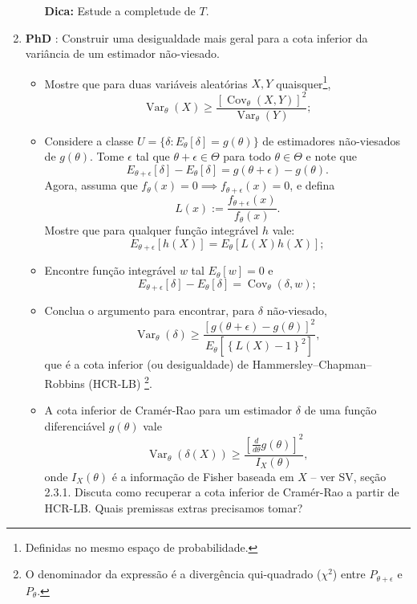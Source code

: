 \documentclass[a4paper,10pt, notitlepage]{report}
\newcommand{\vr}{\operatorname{Var}} %
\begin{document}
\begin{enumerate}
\begin{enumerate}
    \textbf{Dica:} Estude a completude de $T$.
\end{enumerate}
    \item \textbf{PhD }: Construir uma desigualdade mais geral para a cota inferior da variância de um estimador não-viesado.
    \begin{itemize}
        \item Mostre que para duas variáveis aleatórias $X, Y$ quaisquer\footnote{Definidas no mesmo espaço de probabilidade.},
        $$ \vr_\theta(X) \geq \frac{[\operatorname{Cov}_\theta(X, Y)]^2}{\vr_\theta(Y)}; $$
        \item Considere a classe $U = \{ \delta : E_\theta[\delta] = g(\theta) \}$ de estimadores não-viesados de $g(\theta)$.
        Tome $\epsilon$ tal que $\theta + \epsilon \in \Theta$ para todo $\theta \in \Theta$ e note que 
        $$E_{\theta + \epsilon}[\delta] - E_\theta[\delta] = g(\theta + \epsilon) - g(\theta).$$
        Agora, assuma que $f_{\theta}(x) = 0 \implies f_{\theta + \epsilon}(x) = 0$, e defina
        $$ L(x) := \frac{ f_{\theta + \epsilon}(x)}{ f_{\theta}(x)}.$$
        Mostre que para qualquer função integrável $h$ vale:
        $$E_{\theta + \epsilon}[h(X)] = E_{\theta}[L(X)h(X)];$$
        \item Encontre função integrável $w$ tal $E_\theta[w] = 0$ e 
        $$E_{\theta + \epsilon}[\delta] - E_\theta[\delta] = \operatorname{Cov}_\theta(\delta, w);$$
        \item Conclua o argumento para encontrar, para $\delta$ não-viesado,
        \begin{equation}
            \label{eq:HCR}
            \vr_\theta(\delta) \geq \frac{[g(\theta + \epsilon) - g(\theta)]^2}{E_\theta\left[\left\{L(X) - 1\right\}^2\right]},
        \end{equation}
        que é a cota inferior (ou desigualdade) de Hammersley–Chapman–Robbins (HCR-LB) \footnote{O denominador da expressão é a divergência qui-quadrado ($\chi^2$) entre $P_{\theta+\epsilon}$ e $P_\theta$.}.
        \item A cota inferior de Cramér-Rao para um estimador $\delta$ de uma função diferenciável $g(\theta)$ vale
        \begin{equation*}
            \vr_\theta(\delta(X)) \geq \frac{\left[\frac{d}{d\theta}g(\theta)\right]^2}{I_X(\theta)},
        \end{equation*}
        onde $I_X(\theta)$ é a informação de Fisher baseada em $X$ -- ver SV, seção 2.3.1.
        Discuta como recuperar a cota inferior de Cramér-Rao a partir de HCR-LB. Quais premissas extras precisamos tomar?

\end{itemize}
\end{enumerate}
\end{document}
